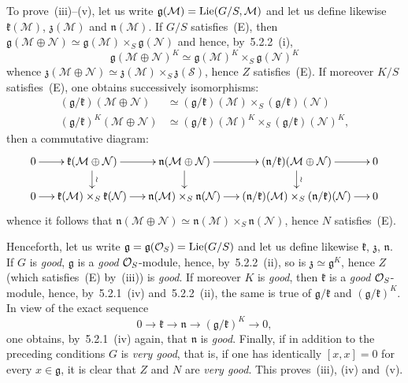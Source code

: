 To prove~(iii)--(v), let us write
\(\mathfrak{g}(\mathcal{M})=\operatorname{Lie}(G/S,\mathcal{M})\) and let us define
likewise \(\mathfrak{k}(\mathcal{M})\), \(\mathfrak{z}(\mathcal{M})\) and
\(\mathfrak{n}(\mathcal{M})\). If \(G/S\) satisfies~(E), then
\(\mathfrak{g}(\mathcal{M}\oplus\mathcal{N})
\simeq\mathfrak{g}(\mathcal{M})\times_S\mathfrak{g}(\mathcal{N})\)
and hence, by~5.2.2~(i),
\[
\mathfrak{g}(\mathcal{M}\oplus\mathcal{N})^{K}
\simeq
\mathfrak{g}(\mathcal{M})^{K}\times_S\mathfrak{g}(\mathcal{N})^{K}
\]
whence
\(\mathfrak{z}(\mathcal{M}\oplus\mathcal{N})
\simeq\mathfrak{z}(\mathcal{M})\times_S\mathfrak{z}(\mathcal{S})\),
hence \(Z\) satisfies~(E). If moreover \(K/S\) satisfies~(E), one obtains
successively isomorphisms:
\begin{align*}
(\mathfrak{g}/\mathfrak{k})(\mathcal{M}\oplus\mathcal{N})
  &\simeq
  (\mathfrak{g}/\mathfrak{k})(\mathcal{M})
  \times_S
  (\mathfrak{g}/\mathfrak{k})(\mathcal{N})\\
(\mathfrak{g}/\mathfrak{k})^{K}(\mathcal{M}\oplus\mathcal{N})
  &\simeq
  (\mathfrak{g}/\mathfrak{k})(\mathcal{M})^{K}
  \times_S
  (\mathfrak{g}/\mathfrak{k})(\mathcal{N})^{K},
\end{align*}
then a commutative diagram:
\[
\xymatrix@C=1.35em@R=1.55em{
0 \ar[r]
  & \mathfrak{k}(\mathcal{M}\oplus\mathcal{N}) \ar[r] \ar[d]^{\wr}
  & \mathfrak{n}(\mathcal{M}\oplus\mathcal{N}) \ar[r] \ar[d]
  & (\mathfrak{n}/\mathfrak{k})(\mathcal{M}\oplus\mathcal{N}) \ar[r] \ar[d]^{\wr}
  & 0
\\
0 \ar[r]
  & \mathfrak{k}(\mathcal{M})\times_S\mathfrak{k}(\mathcal{N}) \ar[r]
  & \mathfrak{n}(\mathcal{M})\times_S\mathfrak{n}(\mathcal{N}) \ar[r]
  & (\mathfrak{n}/\mathfrak{k})(\mathcal{M})
      \times_S(\mathfrak{n}/\mathfrak{k})(\mathcal{N}) \ar[r]
  & 0
}
\]
whence it follows that
\(\mathfrak{n}(\mathcal{M}\oplus\mathcal{N})
\simeq\mathfrak{n}(\mathcal{M})\times_S\mathfrak{n}(\mathcal{N})\),
hence \(N\) satisfies~(E).

Henceforth, let us write \(\mathfrak{g}=\mathfrak{g}(\mathcal{O}_S)=\operatorname{Lie}(G/S)\) and
let us define likewise \(\mathfrak{k}\), \(\mathfrak{z}\), \(\mathfrak{n}\).
If \(G\) is \emph{good}, \(\mathfrak{g}\) is a \emph{good} \(\mathcal{O}_S\)-module,
hence, by~5.2.2~(ii), so is \(\mathfrak{z}\simeq\mathfrak{g}^{K}\), hence
\(Z\) (which satisfies~(E) by~(iii)) is \emph{good}. If moreover \(K\) is
\emph{good}, then \(\mathfrak{k}\) is a \emph{good} \(\mathcal{O}_S\)-module, hence,
by~5.2.1~(iv) and~5.2.2~(ii), the same is true of
\(\mathfrak{g}/\mathfrak{k}\) and \((\mathfrak{g}/\mathfrak{k})^{K}\). In
view of the exact sequence
\[
0\longrightarrow\mathfrak{k}\longrightarrow\mathfrak{n}
\longrightarrow(\mathfrak{g}/\mathfrak{k})^{K}\longrightarrow 0,
\]
one obtains, by~5.2.1~(iv) again, that \(\mathfrak{n}\) is \emph{good}.
Finally, if in addition to the preceding conditions \(G\) is \emph{very
good}, that is, if one has identically \([x,x]=0\) for every
\(x\in\mathfrak{g}\), it is clear that \(Z\) and \(N\) are \emph{very
good}. This proves~(iii), (iv) and~(v).

